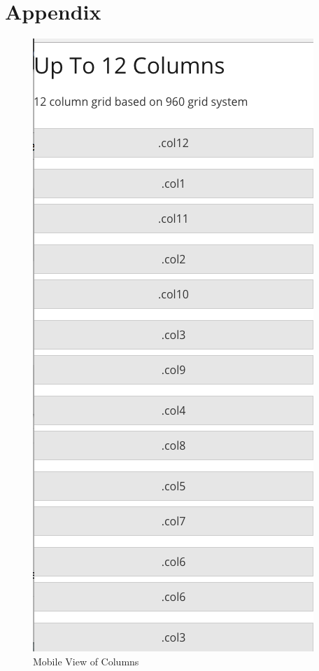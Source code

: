 \chapter*{Appendix}


\begin{figure}[ht]
\centering
\includegraphics[scale=0.4]{images/collapsed}
\caption{Mobile View of Columns}
  \label{fig:collapsed}
\end{figure}

